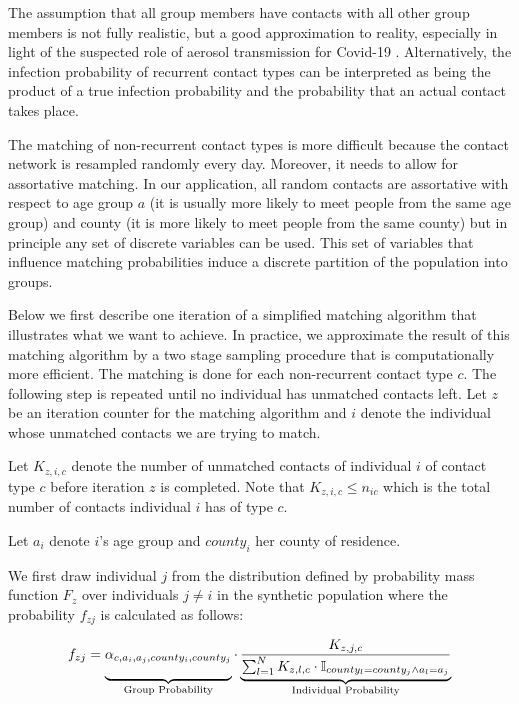 The assumption that all group members have contacts with all other group members
is not fully realistic, but a good approximation to reality, especially in
light of the suspected role of aerosol transmission for Covid-19 \citep{Morawska2020,
Anderson2020}. Alternatively, the infection probability of recurrent contact types can
be interpreted as being the product of a true infection probability and the probability
that an actual contact takes place.


The matching of non-recurrent contact types is more difficult because the contact network
is resampled randomly every day. Moreover, it needs to allow for assortative matching. In
our application, all random contacts are assortative with respect to age group $a$ (it is
usually more likely to meet people from the same age group) and county (it is more likely
to meet people from the same county) but in principle any set of discrete variables can
be used. This set of variables that influence matching probabilities induce a discrete
partition of the population into groups.

Below we first describe one iteration of a simplified matching algorithm that
illustrates what we want to achieve. In practice, we approximate the result of this
matching algorithm by a two stage sampling procedure that is computationally more
efficient. The matching is done for each non-recurrent contact type $c$. The following
step is repeated until no individual has unmatched contacts left. Let $z$ be an iteration
counter for the matching algorithm and $i$ denote the individual whose unmatched
contacts we are trying to match.

Let $K_{z,i,c}$ denote the number of unmatched contacts of individual $i$ of contact type
$c$ before iteration $z$ is completed. Note that $K_{z,i,c} \leq n_{ic}$ which is the
total number of contacts individual $i$ has of type $c$.

Let $a_i$ denote $i$'s age group and $county_i$ her county of residence.

We first draw individual $j$ from the distribution defined by probability mass function
$F_{z}$ over individuals $j \neq i$ in the synthetic population where the probability
$f_{zj}$ is calculated as follows:

\begin{equation}
    \label{eq:combined_matching_probabilities}
    f_{zj} = \underbrace{\alpha_{c,a_i,a_j, county_i, county_j}\vphantom{\frac{bla}{\sum_i^k}}}_{\text{Group Probability}} \cdot \underbrace{\frac{K_{z,j,c}}{\sum_{l=1}^N K_{z,l,c} \cdot \mathbb{I}_{county_l=county_j \land a_l = a_j}}}_{\text{Individual Probability}}
\end{equation}

